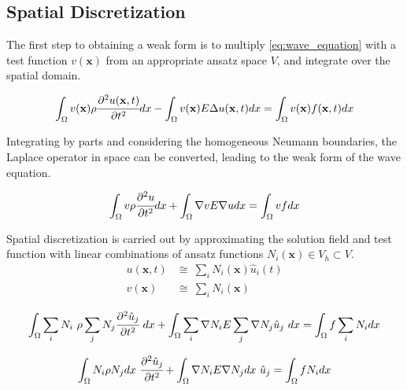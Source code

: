 \subsection*{Spatial Discretization}
\label{subsection:wave_equation_spatial_discretization}

The first step to obtaining a weak form is to multiply \ref{eq:wave_equation} with a test function $v(\mathbf x)$ from an appropriate ansatz space $V$, and integrate over the spatial domain.

\begin{equation}
	\int_{\Omega} v(\mathbf x) \rho \cfrac{\partial^2 u(\mathbf x, t)}{\partial t^2} dx
	-
	\int_{\Omega} v(\mathbf x) E \Delta u(\mathbf x, t) dx
	=
	\int_{\Omega} v(\mathbf x) f(\mathbf x, t) dx
\end{equation}

Integrating by parts and considering the homogeneous Neumann boundaries, the Laplace operator in space can be converted, leading to the weak form of the wave equation.

\begin{equation}
	\int_{\Omega} v \rho \cfrac{\partial^2 u}{\partial t^2} dx
	+
	\int_{\Omega} \nabla v E \nabla u dx
	=
	\int_{\Omega} v f dx
\end{equation}

Spatial discretization is carried out by approximating the solution field and test function with linear combinations of ansatz functions $N_i(\mathbf x) \in V_h \subset V$.
\begin{equation}
	\begin{array}{rl}
		u(\mathbf x, t) &\cong \ \sum_i N_i(\mathbf x) \hat u_i(t) \\
		v(\mathbf x) &\cong \ \sum_i N_i(\mathbf x)
	\end{array}
\end{equation}

\begin{equation}
	\int_{\Omega} \sum_i N_i \ \rho \sum_j N_j \cfrac{\partial^2 \hat u_j}{\partial t^2} \ dx
	+
	\int_{\Omega} \sum_i \nabla N_i E \sum_j \nabla N_j \hat u_j \ dx
	=
	\int_{\Omega} f \sum_i N_i dx
\end{equation}

\begin{equation} \label{eq:wave_equation_spatially_discretized}
	\int_{\Omega} N_i \rho N_j dx \ \cfrac{\partial^2 \hat u_j}{\partial t^2}
	+
	\int_{\Omega} \nabla N_i E \nabla N_j dx \ \hat u_j
	=
	\int_{\Omega} f N_i dx
\end{equation}

